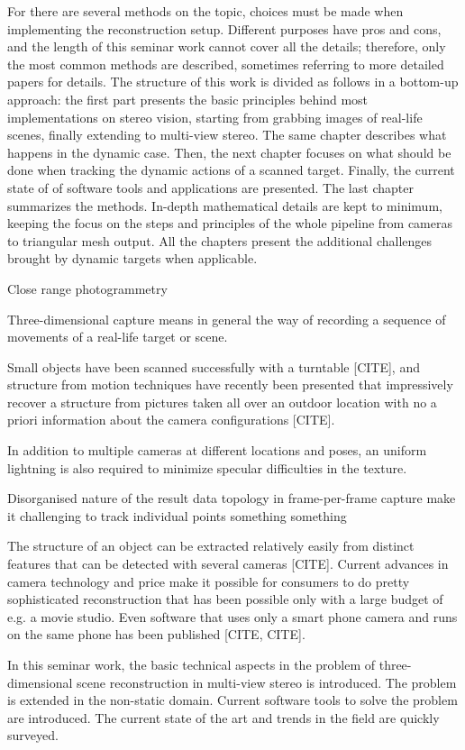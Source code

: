 For there are several methods on the topic, choices must be made when implementing the reconstruction setup.
Different purposes have pros and cons, and the length of this seminar work cannot cover all the details; therefore, only the most common methods are described, sometimes referring to more detailed papers for details.
The structure of this work is divided as follows in a bottom-up approach: the first part presents the basic principles behind most implementations on stereo vision, starting from grabbing images of real-life scenes, finally extending to multi-view stereo.
The same chapter describes what happens in the dynamic case.
Then, the next chapter focuses on what should be done when tracking the dynamic actions of a scanned target.
Finally, the current state of of software tools and applications are presented. The last chapter summarizes the methods.
In-depth mathematical details are kept to minimum, keeping the focus on the steps and principles of the whole pipeline from cameras to triangular mesh output. All the chapters present the additional challenges brought by dynamic targets when applicable.

Close range photogrammetry

Three-dimensional capture means in general the way of recording a sequence of movements of a real-life target or scene.

Small objects have been scanned successfully with a turntable [CITE], and structure from motion techniques have recently been presented that impressively recover a structure from pictures taken all over an outdoor location with no a priori information about the camera configurations [CITE].

In addition to multiple cameras at different locations and poses, an uniform lightning is also required to minimize specular difficulties in the texture.

Disorganised nature of the result data topology in frame-per-frame capture make it challenging to track individual points something something

The structure of an object can be extracted relatively easily from distinct features that can be detected with several cameras [CITE].
Current advances in camera technology and price make it possible for consumers to do pretty sophisticated reconstruction that has been possible only with a large budget of e.g. a movie studio.
Even software that uses only a smart phone camera and runs on the same phone has been published [CITE, CITE].

In this seminar work, the basic technical aspects in the problem of three-dimensional scene reconstruction in multi-view stereo is introduced. The problem is extended in the non-static domain. Current software tools to solve the problem are introduced. The current state of the art and trends in the field are quickly surveyed.
